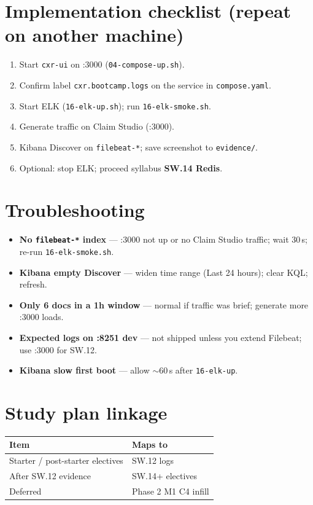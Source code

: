 \documentclass[11pt,a4paper]{report}
\begin{document}
\chapter{Implementation checklist (repeat on another machine)}

\begin{enumerate}
  \item Start \texttt{cxr-ui} on :3000 (\texttt{04-compose-up.sh}).
  \item Confirm label \texttt{cxr.bootcamp.logs} on the service in \texttt{compose.yaml}.
  \item Start ELK (\texttt{16-elk-up.sh}); run \texttt{16-elk-smoke.sh}.
  \item Generate traffic on Claim Studio (:3000).
  \item Kibana Discover on \texttt{filebeat-*}; save screenshot to \texttt{evidence/}.
  \item Optional: stop ELK; proceed syllabus \textbf{SW.14 Redis}.
\end{enumerate}

\chapter{Troubleshooting}

\begin{itemize}
  \item \textbf{No \texttt{filebeat-*} index} --- :3000 not up or no Claim Studio traffic; wait 30\,s; re-run \texttt{16-elk-smoke.sh}.
  \item \textbf{Kibana empty Discover} --- widen time range (Last 24 hours); clear KQL; refresh.
  \item \textbf{Only 6 docs in a 1h window} --- normal if traffic was brief; generate more :3000 loads.
  \item \textbf{Expected logs on :8251 dev} --- not shipped unless you extend Filebeat; use :3000 for SW.12.
  \item \textbf{Kibana slow first boot} --- allow $\sim$60\,s after \texttt{16-elk-up}.
\end{itemize}

\chapter{Study plan linkage}

\begin{center}
\begin{tabular}{ll}
\toprule
Item & Maps to \\
\midrule
Starter / post-starter electives & SW.12 logs \\
After SW.12 evidence & SW.14+ electives \\
Deferred & Phase 2 M1 C4 infill \\
\bottomrule
\end{tabular}
\end{center}
\end{document}
